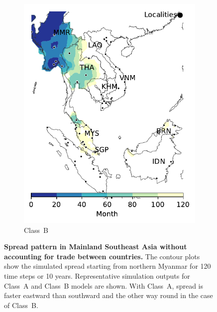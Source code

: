 \documentclass[10pt]{article}
\theoremstyle{definition}
\begin{document}
\begin{figure}[ht]
\begin{subfigure}[b]{.47\textwidth}
    \includegraphics[width=\textwidth]{../cellular_automata/results/contour/MSA_model-B_m1_l3.pdf}
    \caption{Class~B\label{fig:msaClassB}}
\end{subfigure}
\caption{\textbf{Spread pattern in Mainland Southeast Asia without
accounting for trade between countries.} The contour plots show the
simulated spread starting from northern Myanmar for 120 time steps or 10
years. Representative simulation outputs for Class~A and Class~B models are
shown. With {Class~A}, spread is faster eastward than southward and the
other way round in the case of Class~B.\label{fig:msaClassAB} }
\end{figure}
\end{document}
